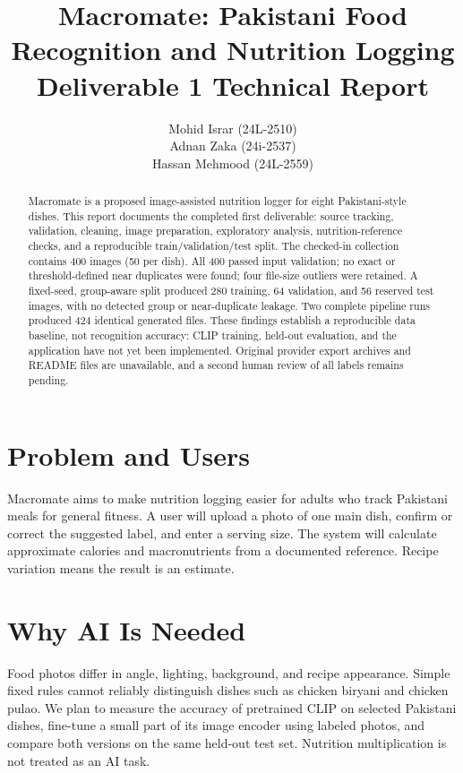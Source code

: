\documentclass[11pt,a4paper]{article}
\title{Macromate: Pakistani Food Recognition and Nutrition Logging\\Deliverable 1 Technical Report}
\author{Mohid Israr (24L-2510)\\Adnan Zaka (24i-2537)\\Hassan Mehmood (24L-2559)}
\date{}
\begin{document}
\maketitle

\begin{abstract}
Macromate is a proposed image-assisted nutrition logger for eight Pakistani-style dishes. This report documents the completed first deliverable: source tracking, validation, cleaning, image preparation, exploratory analysis, nutrition-reference checks, and a reproducible train/validation/test split. The checked-in collection contains 400 images (50 per dish). All 400 passed input validation; no exact or threshold-defined near duplicates were found; four file-size outliers were retained. A fixed-seed, group-aware split produced 280 training, 64 validation, and 56 reserved test images, with no detected group or near-duplicate leakage. Two complete pipeline runs produced 424 identical generated files. These findings establish a reproducible data baseline, not recognition accuracy: CLIP training, held-out evaluation, and the application have not yet been implemented. Original provider export archives and README files are unavailable, and a second human review of all labels remains pending.
\end{abstract}

\section{Problem and Users}
Macromate aims to make nutrition logging easier for adults who track Pakistani meals for general fitness. A user will upload a photo of one main dish, confirm or correct the suggested label, and enter a serving size. The system will calculate approximate calories and macronutrients from a documented reference. Recipe variation means the result is an estimate.

\section{Why AI Is Needed}
Food photos differ in angle, lighting, background, and recipe appearance. Simple fixed rules cannot reliably distinguish dishes such as chicken biryani and chicken pulao. We plan to measure the accuracy of pretrained CLIP on selected Pakistani dishes, fine-tune a small part of its image encoder using labeled photos, and compare both versions on the same held-out test set. Nutrition multiplication is not treated as an AI task.
\end{document}
